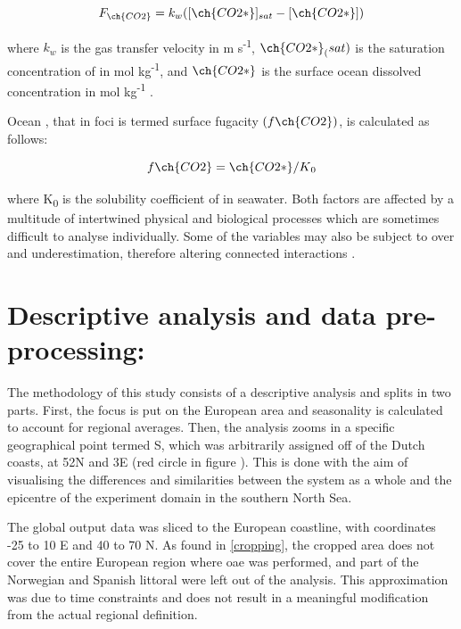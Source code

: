 \begin{center}

\begin{equation}
\label{eqn:1.1}
F_{ \ch{CO2} }  =  k_{w} ([ \ch{CO2*}]_{sat} -[ \ch{CO2*}]) 
\end{equation}

\end{center}

where $ k_{w} $ is the gas transfer velocity in m s\textsuperscript{-1}, $ \ch{CO2*}_({sat}) $ is the saturation concentration of  in mol kg\textsuperscript{-1}, and $ \ch{CO2*} $ is the surface ocean dissolved  concentration in mol kg\textsuperscript{-1} \citep{chien2022foci}.

Ocean , that in \ac{foci} is termed surface  fugacity $(f\ch{CO2})$, is calculated as follows:

\begin{center}

\begin{equation}
\label{eqnfCO2}
f{ \ch{CO2} } = \ch{CO2*} / K\textsubscript{0} 
\end{equation}
    
\end{center}

where K\textsubscript{0} is the solubility coefficient of  in seawater. Both factors are affected by a multitude of intertwined physical and biological processes which are sometimes difficult to analyse individually. Some of the variables may also be subject to over and underestimation, therefore altering connected interactions \citep{chien2022foci}. 

\section{Descriptive analysis and data pre-processing:}

The methodology of this study consists of a descriptive analysis and splits in two parts. First, the focus is put on the European area and seasonality is calculated to account for regional averages. Then, the analysis zooms in a specific geographical point termed S, which was arbitrarily assigned off of the Dutch coasts, at 52\degree N and 3\degree E (red circle in figure ). This is done with the aim of visualising the differences and similarities between the system as a whole and the epicentre of the experiment domain in the southern North Sea. 

The global output data was sliced to the European coastline, with coordinates -25\degree{} to 10\degree{} E and 40\degree{} to 70\degree{} N. As found in \cref{cropping}, the cropped area does not cover the entire European region where \ac{oae} was performed, and part of the Norwegian and Spanish littoral were left out of the analysis. This approximation was due to time constraints and does not result in a meaningful modification from the actual regional definition. 

